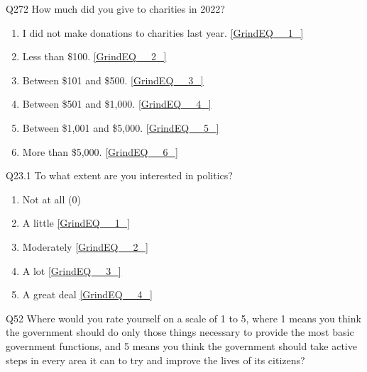 \documentclass{article} %
\begin{document}
\noindent 

\noindent 

\noindent 

\noindent Q272 How much did you give to charities in 2022?

\begin{enumerate}
\item  I did not make donations to charities last year.  \eqref{GrindEQ__1_} 

\item  Less than \$100.  \eqref{GrindEQ__2_} 

\item  Between \$101 and \$500.  \eqref{GrindEQ__3_} 

\item  Between \$501 and \$1,000.  \eqref{GrindEQ__4_} 

\item  Between \$1,001 and \$5,000.  \eqref{GrindEQ__5_} 

\item  More than \$5,000.  \eqref{GrindEQ__6_} 
\end{enumerate}

\noindent 

\noindent 

\noindent 

\noindent Q23.1 To what extent are you interested in politics?

\begin{enumerate}
\item  Not at all  (0) 

\item  A little  \eqref{GrindEQ__1_} 

\item  Moderately  \eqref{GrindEQ__2_} 

\item  A lot  \eqref{GrindEQ__3_} 

\item  A great deal  \eqref{GrindEQ__4_} 
\end{enumerate}

\noindent 

\noindent 

\noindent 

\noindent Q52 Where would you rate yourself on a scale of 1 to 5, where 1 means you think the government should do only those things necessary to provide the most basic government functions, and 5 means you think the government should take active steps in every area it can to try and improve the lives of its citizens?
\end{document}

